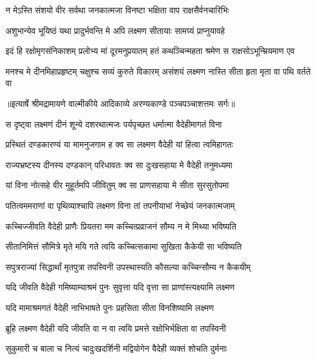 \twolineshloka
{न मेऽस्ति संशयो वीर सर्वथा जनकात्मजा}
{विनष्टा भक्षिता वाप राक्षसैर्वनचारिभिः} %

\twolineshloka
{अशुभान्येव भूयिष्ठं यथा प्रादुर्भवन्ति मे}
{अपि लक्ष्मण सीतायाः सामग्र्यं प्राप्नुयावहे} %

\fourlineindentedshloka
{इदं हि रक्षोमृगसंनिकाशम्}
{प्रलोभ्य मां दूरमनुप्रयातम्}
{हतं कथञ्चिन्महता श्रमेण}
{स राक्षसोऽभून्म्रियमाण एव} %

\fourlineindentedshloka
{मनश्च मे दीनमिहाप्रहृष्टम्}
{चक्षुश्च सव्यं कुरुते विकारम्}
{असंशयं लक्ष्मण नास्ति सीता}
{हृता मृता वा पथि वर्तते वा} %


{॥इत्यार्षे श्रीमद्रामायणे वाल्मीकीये आदिकाव्ये अरण्यकाण्डे पञ्चपञ्चाशत्तमः सर्गः॥}


\twolineshloka
{स दृष्ट्वा लक्ष्मणं दीनं शून्ये दशरथात्मजः}
{पर्यपृच्छत धर्मात्मा वैदेहीमागतं विना} %

\twolineshloka
{प्रस्थितं दण्डकारण्यं या मामनुजगाम ह}
{क्व सा लक्ष्मण वैदेही यां हित्वा त्वमिहागतः} %

\twolineshloka
{राज्यभ्रष्टस्य दीनस्य दण्डकान् परिधावतः}
{क्व सा दुःखसहाया मे वैदेही तनुमध्यमा} %

\twolineshloka
{यां विना नोत्सहे वीर मुहूर्तमपि जीवितुम्}
{क्व सा प्राणसहाया मे सीता सुरसुतोपमा} %

\twolineshloka
{पतित्वममराणां वा पृथिव्याश्चापि लक्ष्मण}
{विना तां तपनीयाभां नेच्छेयं जनकात्मजाम्} %

\twolineshloka
{कच्चिज्जीवति वैदेही प्राणैः प्रियतरा मम}
{कच्चित्प्रव्राजनं सौम्य न मे मिथ्या भविष्यति} %

\twolineshloka
{सीतानिमित्तं सौमित्रे मृते मयि गते त्वयि}
{कच्चित्सकामा सुखिता कैकेयी सा भविष्यति} %

\twolineshloka
{सपुत्रराज्यां सिद्धार्थां मृतपुत्रा तपस्विनी}
{उपस्थास्यति कौसल्या कच्चिन्सौम्य न कैकयीम्} %

\twolineshloka
{यदि जीवति वैदेही गमिष्याम्याश्रमं पुनः}
{सुवृत्ता यदि वृत्ता सा प्राणांस्त्यक्ष्यामि लक्ष्मण} %

\twolineshloka
{यदि मामाश्रमगतं वैदेही नाभिभाषते}
{पुनः प्रहसिता सीता विनशिष्यामि लक्ष्मण} %

\twolineshloka
{ब्रूहि लक्ष्मण वैदेही यदि जीवति वा न वा}
{त्वयि प्रमत्ते रक्षोभिर्भक्षिता वा तपस्विनी} %

\twolineshloka
{सुकुमारी च बाला च नित्यं चादुःखदर्शिनी}
{मद्वियोगेन वैदेही व्यक्तं शोचति दुर्मनाः} %


